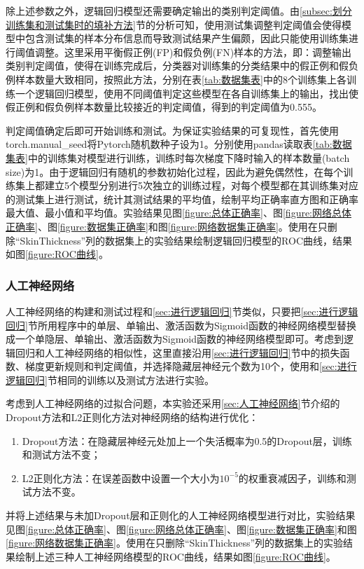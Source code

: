 \documentclass[a4paper]{ctexart}
\begin{document}
除上述参数之外，逻辑回归模型还需要确定输出的类别判定阈值。由\ref{subsec:划分训练集和测试集时的填补方法}节的分析可知，使用测试集调整判定阈值会使得模型中包含测试集的样本分布信息而导致测试结果产生偏颇，因此只能使用训练集进行阈值调整。这里采用平衡假正例(FP)和假负例(FN)样本的方法，即：调整输出类别判定阈值，使得在训练完成后，分类器对训练集的分类结果中的假正例和假负例样本数量大致相同，按照此方法，分别在表\ref{tab:数据集表}中的8个训练集上各训练一个逻辑回归模型，使用不同阈值判定这些模型在各自训练集上的输出，找出使假正例和假负例样本数量比较接近的判定阈值，得到的判定阈值为0.555。

判定阈值确定后即可开始训练和测试。为保证实验结果的可复现性，首先使用
torch.manual\_seed将Pytorch随机数种子设为1。分别使用pandas读取表\ref{tab:数据集表}中的训练集对模型进行训练，训练时每次梯度下降时输入的样本数量(batch size)为1。由于逻辑回归有随机的参数初始化过程，因此为避免偶然性，在每个训练集上都建立5个模型分别进行5次独立的训练过程，对每个模型都在其训练集对应的测试集上进行测试，统计其测试结果的平均值，绘制平均正确率直方图和正确率最大值、最小值和平均值。实验结果见图\ref{figure:总体正确率}、图\ref{figure:网络总体正确率}、图\ref{figure:数据集正确率}和图\ref{figure:网络数据集正确率}。使用在只删除“SkinThickness”列的数据集上的实验结果绘制逻辑回归模型的ROC曲线，结果如图\ref{figure:ROC曲线}。


\subsubsection{人工神经网络}\label{sec:ANN实践}
人工神经网络的构建和测试过程和\ref{sec:进行逻辑回归}节类似，只要把\ref{sec:进行逻辑回归}节所用程序中的单层、单输出、激活函数为Sigmoid函数的神经网络模型替换成一个单隐层、单输出、激活函数为Sigmoid函数的神经网络模型即可。考虑到逻辑回归和人工神经网络的相似性，这里直接沿用\ref{sec:进行逻辑回归}节中的损失函数、梯度更新规则和判定阈值，并选择隐藏层神经元个数为10个，使用和\ref{sec:进行逻辑回归}节相同的训练以及测试方法进行实验。

考虑到人工神经网络的过拟合问题，本实验还采用\ref{sec:人工神经网络}节介绍的Dropout方法和L2正则化方法对神经网络的结构进行优化：
\begin{enumerate}
	\item Dropout方法：在隐藏层神经元处加上一个失活概率为0.5的Dropout层，训练和测试方法不变；
	\item L2正则化方法：在误差函数中设置一个大小为$10^{-5}$的权重衰减因子，训练和测试方法不变。
\end{enumerate}
并将上述结果与未加Dropout层和正则化的人工神经网络模型进行对比，实验结果见图\ref{figure:总体正确率}、图\ref{figure:网络总体正确率}、图\ref{figure:数据集正确率}和图\ref{figure:网络数据集正确率}。使用在只删除“SkinThickness”列的数据集上的实验结果绘制上述三种人工神经网络模型的ROC曲线，结果如图\ref{figure:ROC曲线}。
\end{document}
